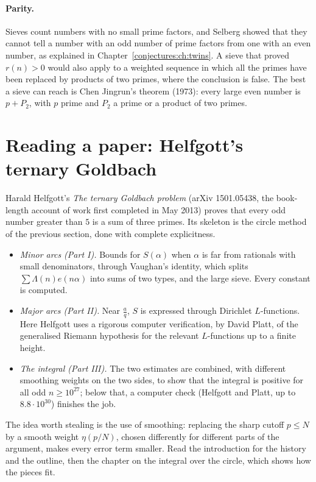 \paragraph{Parity.} Sieves count numbers with no small prime factors, and Selberg showed that they cannot tell a number with an odd number of prime
factors from one with an even number, as explained in Chapter~\ref{conjectures:ch:twins}. A sieve that proved $r(n)>0$ would also apply to a weighted sequence
in which all the primes have been replaced by products of two primes, where the conclusion is false. The best a sieve can reach is Chen Jingrun's
theorem (1973): every large even number is $p+P_2$, with $p$ prime and $P_2$ a prime or a product of two primes.

\section{Reading a paper: Helfgott's ternary Goldbach}

Harald Helfgott's \emph{The ternary Goldbach problem} (arXiv 1501.05438, the book-length account of work first completed in May 2013) proves that every
odd number greater than $5$ is a sum of three primes. Its skeleton is the circle method of the previous section, done with complete explicitness.
\begin{itemize}
\item \emph{Minor arcs (Part I).} Bounds for $S(\alpha)$ when $\alpha$ is far from rationals with small denominators, through Vaughan's identity, which
splits $\sum\Lambda(n)e(n\alpha)$ into sums of two types, and the large sieve. Every constant is computed.
\item \emph{Major arcs (Part II).} Near $\frac aq$, $S$ is expressed through Dirichlet $L$-functions. Here Helfgott uses a rigorous computer verification,
by David Platt, of the generalised Riemann hypothesis for the relevant $L$-functions up to a finite height.
\item \emph{The integral (Part III).} The two estimates are combined, with different smoothing weights on the two sides, to show that the integral is
positive for all odd $n\ge10^{27}$; below that, a computer check (Helfgott and Platt, up to $8.8\cdot10^{30}$) finishes the job.
\end{itemize}
The idea worth stealing is the use of smoothing: replacing the sharp cutoff $p\le N$ by a smooth weight $\eta(p/N)$, chosen differently for different
parts of the argument, makes every error term smaller. Read the introduction for the history and the outline, then the chapter on the integral over the
circle, which shows how the pieces fit.

